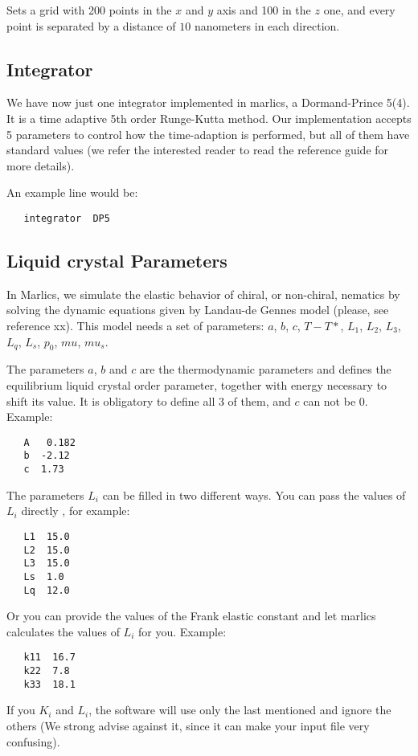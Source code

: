 \documentclass{article}
\begin{document}
Sets a grid with 200 points in the $x$ and $y$ axis and 100 in the $z$ one, and every point is separated by a distance of $10$ nanometers in each direction.

\subsection{Integrator}

 We have now just one integrator implemented in marlics, a Dormand-Prince 5(4). It is a time adaptive 5th order Runge-Kutta method. Our implementation accepts 5 parameters to control how the time-adaption is performed, but all of them have standard values (we refer the interested reader to read the reference guide for more details).

 An example line would be:
\begin{lstlisting}
   integrator  DP5
\end{lstlisting}

\subsection{Liquid crystal Parameters}

In Marlics, we simulate the elastic behavior of chiral, or non-chiral, nematics by solving the dynamic equations given by Landau-de Gennes 
model (please, see reference xx). This model needs a set of parameters: $a$, $b$, $c$, $T-T*$, $L_1$, $L_2$, $L_3$, $L_q$, $L_s$, $p_0$, $mu$, $mu_s$.

The parameters $a$, $b$ and $c$ are the thermodynamic parameters and defines the equilibrium liquid crystal order parameter, together with energy necessary to shift its value. It is obligatory to define all 3 of them, and $c$ can not be 0.
Example:
\begin{lstlisting}	
   A   0.182
   b  -2.12
   c  1.73
\end{lstlisting}


The parameters $L_i$ can be filled in two different ways. You can pass the values of $L_i$ directly , for example:
\begin{lstlisting}
   L1  15.0
   L2  15.0
   L3  15.0
   Ls  1.0 
   Lq  12.0
\end{lstlisting}


Or you can provide the values of the Frank elastic constant and let marlics calculates the values of $L_i$ for you. Example:
\begin{lstlisting}
   k11  16.7
   k22  7.8
   k33  18.1
\end{lstlisting}
If you  $K_i$ and $L_i$, the software will use only the last mentioned and ignore the others (We strong advise against it, since it can make your input file very confusing).
\end{document}
